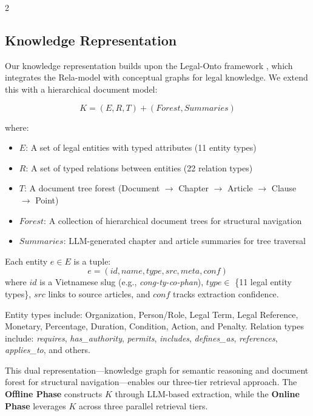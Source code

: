 \documentclass[11pt,a4paper]{article}
\begin{document}
\begin{multicols}{2}

\subsection{Knowledge Representation}

Our knowledge representation builds upon the Legal-Onto framework \cite{ref6}, which integrates the Rela-model \cite{ref10} with conceptual graphs for legal knowledge. We extend this with a hierarchical document model:

\begin{equation}
K = (E, R, T) + (Forest, Summaries)
\end{equation}

where:
\begin{itemize}
\item $E$: A set of legal entities with typed attributes (11 entity types)
\item $R$: A set of typed relations between entities (22 relation types)
\item $T$: A document tree forest (Document $\rightarrow$ Chapter $\rightarrow$ Article $\rightarrow$ Clause $\rightarrow$ Point)
\item $Forest$: A collection of hierarchical document trees for structural navigation
\item $Summaries$: LLM-generated chapter and article summaries for tree traversal
\end{itemize}

Each entity $e \in E$ is a tuple:
\begin{equation}
e = (id, name, type, src, meta, conf)
\end{equation}
where $id$ is a Vietnamese slug (e.g., \textit{cong-ty-co-phan}), $type \in$ \{11 legal entity types\}, $src$ links to source articles, and $conf$ tracks extraction confidence.

Entity types include: Organization, Person/Role, Legal Term, Legal Reference, Monetary, Percentage, Duration, Condition, Action, and Penalty. Relation types include: \textit{requires}, \textit{has\_authority}, \textit{permits}, \textit{includes}, \textit{defines\_as}, \textit{references}, \textit{applies\_to}, and others.

This dual representation---knowledge graph for semantic reasoning and document forest for structural navigation---enables our three-tier retrieval approach. The \textbf{Offline Phase} constructs $K$ through LLM-based extraction, while the \textbf{Online Phase} leverages $K$ across three parallel retrieval tiers.


\end{multicols}
\end{document}
